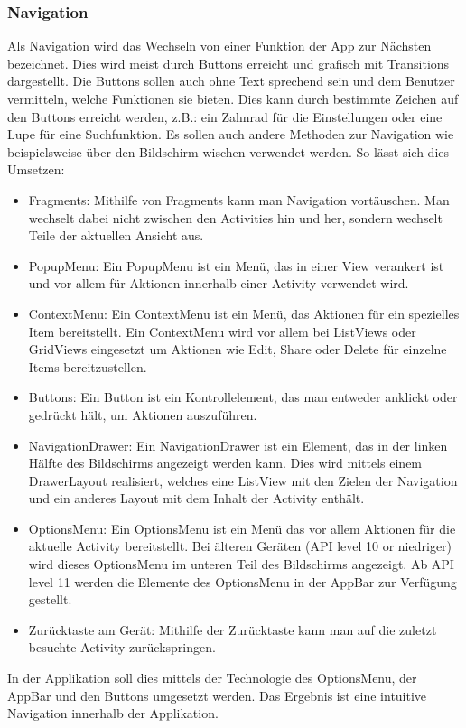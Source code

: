 \documentclass[FIPLY_base.tex]{subfiles}
\begin{document}
\subsubsection{Navigation}
Als Navigation wird das Wechseln von einer Funktion der App zur Nächsten bezeichnet. Dies wird meist durch Buttons erreicht und grafisch mit Transitions dargestellt.
Die Buttons sollen auch ohne Text sprechend sein und dem Benutzer vermitteln, welche Funktionen sie bieten. Dies kann durch bestimmte Zeichen auf den Buttons erreicht werden, z.B.: ein Zahnrad für die Einstellungen oder eine Lupe für eine Suchfunktion. Es sollen auch andere Methoden zur Navigation wie beispielsweise über den Bildschirm wischen verwendet werden.
So lässt sich dies Umsetzen:
\begin{itemize}
	\item Fragments: Mithilfe von Fragments kann man Navigation vortäuschen. Man wechselt dabei nicht zwischen den Activities hin und her, sondern wechselt Teile der aktuellen Ansicht aus.
	\item PopupMenu: Ein PopupMenu ist ein Menü, das in einer View verankert ist und vor allem für Aktionen innerhalb einer Activity verwendet wird.
	\item ContextMenu: Ein ContextMenu ist ein Menü, das Aktionen für ein spezielles Item bereitstellt. Ein ContextMenu wird vor allem bei ListViews oder GridViews eingesetzt um Aktionen wie Edit, Share oder Delete für einzelne Items bereitzustellen.
	\item Buttons: Ein Button ist ein Kontrollelement, das man entweder anklickt oder gedrückt hält, um Aktionen auszuführen.
	\item NavigationDrawer: Ein NavigationDrawer ist ein Element, das in der linken Hälfte des Bildschirms angezeigt werden kann. Dies wird mittels einem DrawerLayout realisiert, welches eine ListView mit den Zielen der Navigation und ein anderes Layout mit dem Inhalt der Activity enthält.
	\item OptionsMenu: Ein OptionsMenu ist ein Menü das vor allem Aktionen für die aktuelle Activity bereitstellt. 
	Bei älteren Geräten (API level 10 or niedriger) wird dieses OptionsMenu im unteren Teil des Bildschirms angezeigt.
	Ab API level 11 werden die Elemente des OptionsMenu in der AppBar zur Verfügung gestellt.
	\item Zurücktaste am Gerät: Mithilfe der Zurücktaste kann man auf die zuletzt besuchte Activity zurückspringen.
\end{itemize}
In der Applikation soll dies mittels der Technologie des OptionsMenu, der AppBar und den Buttons umgesetzt werden. Das Ergebnis ist eine intuitive Navigation innerhalb der Applikation.
\end{document}
